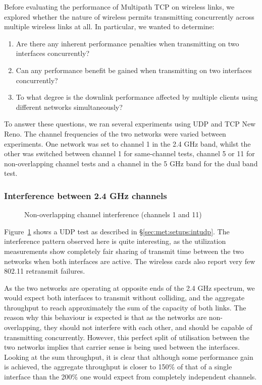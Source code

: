 Before evaluating the performance of Multipath TCP on wireless links, we
explored whether the nature of wireless permits transmitting
concurrently across multiple wireless links at all. In particular, we wanted
to determine:

\begin{enumerate}
  \item Are there any inherent performance penalties when transmitting on two
    interfaces concurrently?
  \item Can any performance benefit be gained when transmitting on two
    interfaces concurrently?
  \item To what degree is the downlink performance affected by multiple clients
    using different networks simultaneously?
\end{enumerate}

To answer these questions, we ran several experiments using UDP and TCP New 
Reno.
The channel frequencies of the two networks were varied between experiments. One
network was set to channel 1 in the 2.4 GHz band, whilst the other
was switched between channel 1 for same-channel tests, channel 5 or 11 for
non-overlapping channel tests and a channel in the 5 GHz band for the dual band 
test. 

\subsubsection{Interference between 2.4 GHz channels}

\begin{figure}[h]
 \centering
 
 \caption{Non-overlapping channel interference (channels 1 and 11)}\label{graph:cc-interference}
\end{figure}

Figure~\ref{graph:cc-interference} shows a UDP test as described in 
\S\ref{sec:met:setups:intudp}.
The interference pattern observed here is quite interesting, as the
utilization measurements show completely fair sharing of transmit time
between the two networks when both interfaces are active. The
wireless cards also report very few 802.11 retransmit failures.

As the two networks are operating at opposite ends of the 2.4 GHz spectrum, we
would expect both interfaces to transmit without colliding,
and the aggregate throughput to reach approximately the sum of the capacity of
both links. The reason why this behaviour is expected is that as the networks are non-overlapping, they should not interfere with each other, and
should be capable of transmitting concurrently. However, this perfect split of
utilisation between the two networks implies that carrier sense is being used between the interfaces.
Looking at the sum throughput, it is clear that although some performance gain is
achieved, the aggregate throughput is closer to 150\% of that of a single
interface than the 200\% one would expect from completely independent channels.

